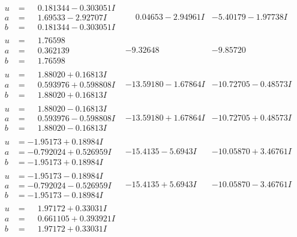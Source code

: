 \documentclass[1p]{elsarticle_modified}
\theoremstyle{definition}
\begin{document}
$$\begin{array}{c|c|c}
\begin{aligned}
u &= \phantom{-}0.181344 - 0.303051 I \\
a &= \phantom{-}1.69533 - 2.92707 I \\
b &= \phantom{-}0.181344 - 0.303051 I\end{aligned}
 & \phantom{-}0.04653 - 2.94961 I & -5.40179 - 1.97738 I \\ \hline\begin{aligned}
u &= \phantom{-}1.76598\phantom{ +0.000000I} \\
a &= \phantom{-}0.362139\phantom{ +0.000000I} \\
b &= \phantom{-}1.76598\phantom{ +0.000000I}\end{aligned}
 & -9.32648\phantom{ +0.000000I} & -9.85720\phantom{ +0.000000I} \\ \hline\begin{aligned}
u &= \phantom{-}1.88020 + 0.16813 I \\
a &= \phantom{-}0.593976 + 0.598808 I \\
b &= \phantom{-}1.88020 + 0.16813 I\end{aligned}
 & -13.59180 - 1.67864 I & -10.72705 - 0.48573 I \\ \hline\begin{aligned}
u &= \phantom{-}1.88020 - 0.16813 I \\
a &= \phantom{-}0.593976 - 0.598808 I \\
b &= \phantom{-}1.88020 - 0.16813 I\end{aligned}
 & -13.59180 + 1.67864 I & -10.72705 + 0.48573 I \\ \hline\begin{aligned}
u &= -1.95173 + 0.18984 I \\
a &= -0.792024 + 0.526959 I \\
b &= -1.95173 + 0.18984 I\end{aligned}
 & -15.4135 - 5.6943 I & -10.05870 + 3.46761 I \\ \hline\begin{aligned}
u &= -1.95173 - 0.18984 I \\
a &= -0.792024 - 0.526959 I \\
b &= -1.95173 - 0.18984 I\end{aligned}
 & -15.4135 + 5.6943 I & -10.05870 - 3.46761 I \\ \hline\begin{aligned}
u &= \phantom{-}1.97172 + 0.33031 I \\
a &= \phantom{-}0.661105 + 0.393921 I \\
b &= \phantom{-}1.97172 + 0.33031 I\end{aligned}

\end{array}$$
\end{document}
